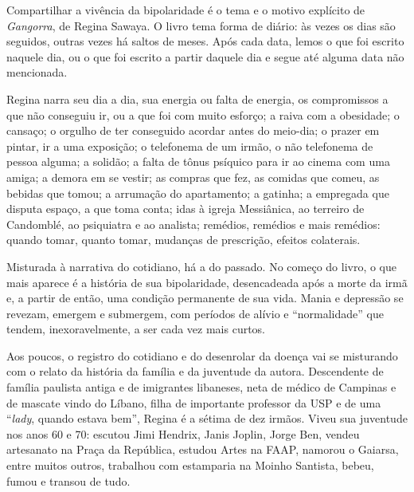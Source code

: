 


{Compartilhar a vivência da bipolaridade} é o tema e o motivo explícito
de \emph{Gangorra}{, de Regina Sawaya. O livro tema forma de diário: às
vezes os dias são seguidos, outras vezes há saltos de meses. Após cada
data, lemos o que foi escrito naquele dia, ou o que foi escrito a partir
daquele dia e segue até alguma data não mencionada.}

{Regina narra seu dia a dia, sua energia ou falta de energia, os
compromissos a que não conseguiu ir, ou a que foi com muito esforço; a
raiva com a obesidade; o cansaço; o orgulho de ter conseguido acordar
antes do meio-dia; o prazer em pintar, ir a uma exposição; o telefonema
de um irmão, o não telefonema de pessoa alguma; a solidão; a falta de
tônus psíquico para ir ao cinema com uma amiga; a demora em se vestir;
as compras que fez, as comidas que comeu, as bebidas que tomou; a
arrumação do apartamento; a gatinha; a empregada que disputa espaço, a
que toma conta; idas à igreja Messiânica, ao terreiro de Candomblé, ao
psiquiatra e ao analista; remédios, remédios e mais remédios: quando
tomar, quanto tomar, mudanças de prescrição, efeitos colaterais.}

{Misturada à narrativa do cotidiano, há a do passado. No começo do
livro, o que mais aparece é a história de sua bipolaridade, desencadeada
após a morte da irmã e, a partir de então, uma condição permanente de
sua vida. Mania e depressão se revezam, emergem e submergem, com
períodos de alívio e ``normalidade'' que tendem, inexoravelmente, a ser
cada vez mais curtos.}

{Aos poucos, o registro do cotidiano e do desenrolar da doença vai se
misturando com o relato da história da família e da juventude da autora.
Descendente de família paulista antiga e de imigrantes
libaneses, neta de médico de Campinas e de mascate vindo do Líbano,
filha de importante professor da USP e de uma ``}\emph{lady}{, quando
estava bem'', Regina é a sétima de dez irmãos. Viveu sua juventude nos
anos 60 e 70: escutou Jimi Hendrix, Janis Joplin, Jorge Ben, vendeu
artesanato na Praça da República, estudou Artes na FAAP, namorou o
Gaiarsa, entre muitos outros, trabalhou com estamparia na Moinho
Santista, bebeu, fumou e transou de tudo.}

\asterisc

